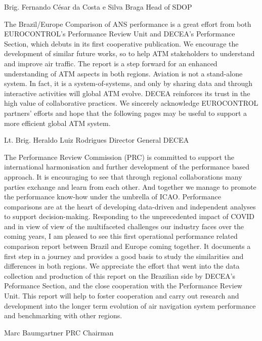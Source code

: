 \documentclass[
]{book}
\begin{document}
Brig. Fernando César da Costa e Silva Braga
Head of SDOP

The Brazil/Europe Comparison of ANS performance is a great effort from both EUROCONTROL's Performance Review Unit and DECEA's Performance Section, which debuts in its first cooperative publication. We encourage the development of similar future works, so to help ATM stakeholders to understand and improve air traffic.
The report is a step forward for an enhanced understanding of ATM aspects in both regions. Aviation is not a stand-alone system. In fact, it is a system-of-systems, and only by sharing data and through interactive activities will global ATM evolve.
DECEA reinforces its trust in the high value of collaborative practices. We sincerely acknowledge EUROCONTROL partners' efforts and hope that the following pages may be useful to support a more efficient global ATM system.

Lt. Brig. Heraldo Luiz Rodrigues
Director General DECEA

The Performance Review Commission (PRC) is committed to support the international harmonisation and further development of the performance based approach. It is encouraging to see that through regional collaborations many parties exchange and learn from each other. And together we manage to promote the performance know-how under the umbrella of ICAO.
Performance comparisons are at the heart of developing data-driven and independent analyses to support decision-making.
Responding to the unprecedented impact of COVID and in view of view of the multifaceted challenges our industry faces over the coming years, I am pleased to see this first operational performance related comparison report between Brazil and Europe coming together.
It documents a first step in a journey and provides a good basis to study the similarities and differences in both regions.
We appreciate the effort that went into the data collection and production of this report on the Brazilian side by DECEA's Peformance Section, and the close cooperation with the Performance Review Unit.
This report will help to foster cooperation and carry out research and development into the longer term evolution of air navigation system performance and benchmarking with other regions.

Marc Baumgartner
PRC Chairman
\end{document}
